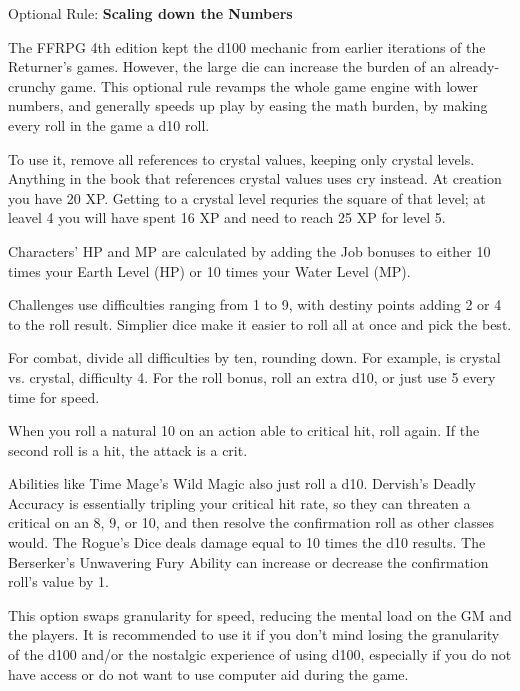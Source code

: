 \begin{multiboco}
    Optional Rule: \textbf{Scaling down the Numbers}\label{optrule:scaling}\pc%

    The FFRPG 4th edition kept the d100 mechanic from earlier iterations of the Returner’s games. However, the large die can increase the burden of an already-crunchy game. This optional rule revamps the whole game engine with lower numbers, and generally speeds up play by easing the math burden, by making every roll in the game a d10 roll.

    To use it, remove all references to crystal values, keeping only crystal levels. Anything in the book that references crystal values uses cry instead. At creation you have 20 XP\@. Getting to a crystal level requries the square of that level; at leavel 4 you will have spent 16 XP and need to reach 25 XP for level 5.

    Characters' HP and MP are calculated by adding the Job bonuses to either 10 times your Earth Level (HP) or 10 times your Water Level (MP).

    Challenges use difficulties ranging from 1 to 9, with destiny points adding 2 or 4 to the roll result. Simplier dice make it easier to roll all at once and pick the best.

    For combat, divide all difficulties by ten, rounding down. For example,  is crystal vs. crystal, difficulty 4. For the roll bonus, roll an extra d10, or just use 5 every time for speed.

    When you roll a natural 10 on an action able to critical hit, roll again. If the second roll is a hit, the attack is a crit.

    Abilities like Time Mage’s Wild Magic also just roll a d10. Dervish's Deadly Accuracy is essentially tripling your critical hit rate, so they can threaten a critical on an 8, 9, or 10, and then resolve the confirmation roll as other classes would. The Rogue’s Dice deals damage equal to 10 times the d10 results. The Berserker’s Unwavering Fury Ability can increase or decrease the confirmation roll’s value by 1.

    This option swaps granularity for speed, reducing the mental load on the GM and the players. It is recommended to use it if you don’t mind losing the granularity of the d100 and/or the nostalgic experience of using d100, especially if you do not have access or do not want to use computer aid during the game.
\end{multiboco}